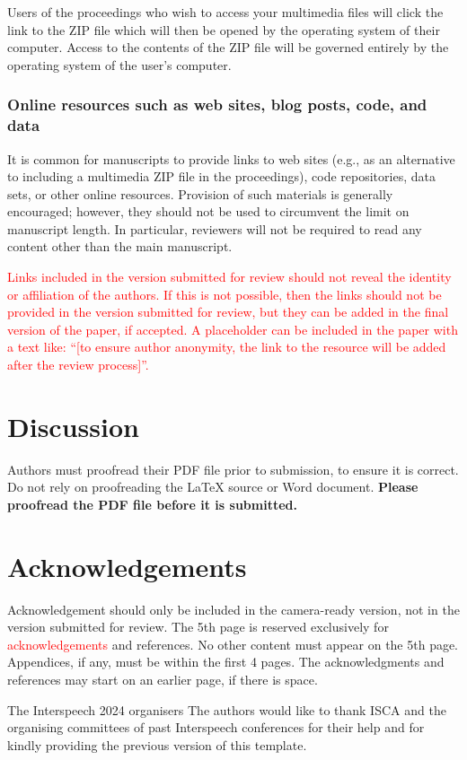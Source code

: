 \documentclass{Interspeech2024}
\newcommand{\red}[1]{\textcolor{red}{#1}}
\begin{document}
Users of the proceedings who wish to access your multimedia files will click the link to the ZIP file which will then be opened by the operating system of their computer. Access to the contents of the ZIP file will be governed entirely by the operating system of the user's computer.

\subsubsection{Online resources such as web sites, blog posts, code, and data}

It is common for manuscripts to provide links to web sites (e.g., as an alternative to including a multimedia ZIP file in the proceedings), code repositories, data sets, or other online resources. Provision of such materials is generally encouraged; however, they should not be used to circumvent the limit on manuscript length. In particular, reviewers will not be required to read any content other than the main manuscript.

\red{Links included in the version submitted for review should not reveal the identity or affiliation of the authors. If this is not possible, then the links should not be provided in the version submitted for review, but they can be added in the final version of the paper, if accepted. A placeholder can be included in the paper with a text like: ``[to ensure author anonymity, the link to the resource will be added after the review process]''. }


\section{Discussion}

Authors must proofread their PDF file prior to submission, to ensure it is correct. Do not rely on proofreading the \LaTeX\xspace source or Word document. \textbf{Please proofread the PDF file before it is submitted.}


\section{Acknowledgements}
Acknowledgement should only be included in the camera-ready version, not in the version submitted for review.
The 5th page is reserved exclusively for \red{acknowledgements} and  references. No other content must appear on the 5th page. Appendices, if any, must be within the first 4 pages. The acknowledgments and references may start on an earlier page, if there is space.

\ifinterspeechfinal
     The Interspeech 2024 organisers
\else
     The authors
\fi
would like to thank ISCA and the organising committees of past Interspeech conferences for their help and for kindly providing the previous version of this template.




\end{document}

